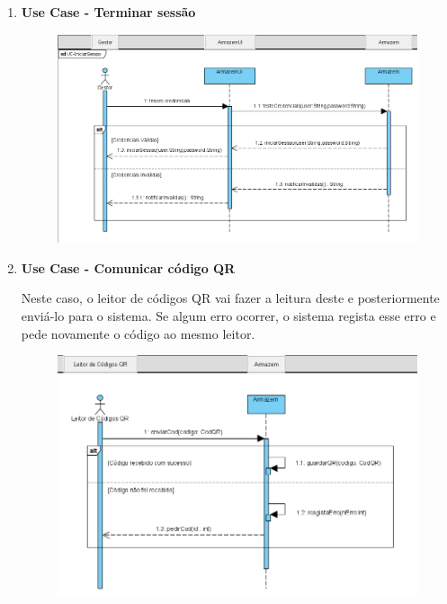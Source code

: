 \documentclass[a4paper]{report}
\begin{document}
\begin{enumerate}
       
       \item \textbf{Use Case - Terminar sessão}
       
       \begin{figure}[H]
        \centering
        \includegraphics[scale=0.50]{images/UC-IniciarSessao.PNG}
        \caption{}
        \end{figure}
       
       \pagebreak
       \item \textbf{Use Case - Comunicar código QR}
            
            Neste caso, o leitor de códigos QR vai fazer a leitura deste e posteriormente enviá-lo para o sistema. Se algum erro ocorrer, o sistema regista esse erro e pede novamente o código ao mesmo leitor.
       
        \begin{figure}[H]
        \centering
        \includegraphics[scale=0.50]{images/UC-ComunicarQR.PNG}
        \caption{}
        \end{figure}
        

\end{enumerate}
\end{document}

